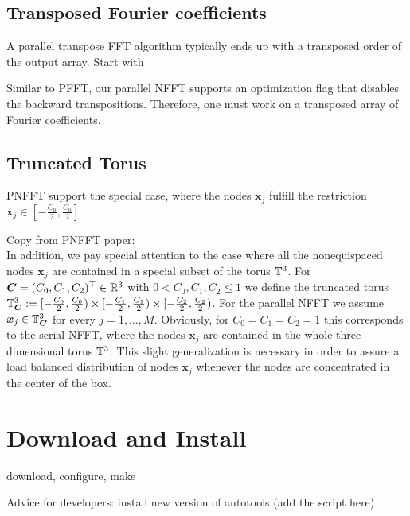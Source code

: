 \subsection{Transposed Fourier coefficients}
A parallel transpose FFT algorithm typically ends up with a transposed order of the output array.
Start with


Similar to PFFT, our parallel NFFT supports an optimization flag that disables the backward transpositions. Therefore, one must work on a transposed array of Fourier coefficients.


\subsection{Truncated Torus}
PNFFT support the special case, where the nodes $\mathbf x_j$ fulfill the restriction $\mathbf x_j \in \left[-\frac{C_0}{2},\frac{C_0}{2} \right]$

Copy from PNFFT paper:\\
In addition, we pay special attention to the case where all the nonequispaced nodes $\mathbf x_j$
are contained in a special subset of the torus $\mathbb{T}^3$. For $\boldsymbol{C}=(C_0,C_1,C_2)^\top\in\mathbb{R}^3$ with $0<C_0,C_1,C_2\le 1$
we define the truncated torus $\mathbb{T}^3_{\boldsymbol{C}} := [-\frac{C_0}{2},\frac{C_0}{2})\times [-\frac{C_1}{2},\frac{C_1}{2}) \times [-\frac{C_2}{2},\frac{C_2}{2})$.
For the parallel NFFT we assume $\boldsymbol{x}_j\in\mathbb{T}^3_{\boldsymbol{C}}$ for every $j=1,\hdots,M$.
Obviously, for $C_0=C_1=C_2=1$ this corresponds to the serial NFFT, where the nodes $\mathbf x_j$ are contained in the whole three-dimensional torus $\mathbb{T}^3$.
This slight generalization is necessary in order to assure a load balanced distribution of nodes $\mathbf x_j$ whenever the nodes are
concentrated in the center of the box.


\section{Download and Install}
\begin{compactitem}
  \item download, configure, make
  \item Advice for developers: install new version of autotools (add the script here)
\end{compactitem}






